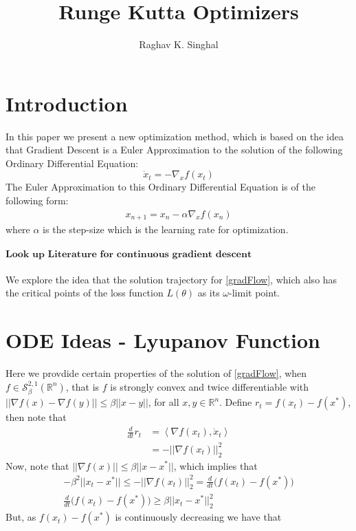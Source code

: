 \documentclass[12pt,twoside]{article}
\date{}   %
\begin{document}
\title{Runge Kutta Optimizers}

\author{Raghav K. Singhal}

\maketitle

\section{Introduction}
In this paper we present a new optimization method, which is based on the idea that Gradient Descent is a Euler Approximation to the solution of the following Ordinary Differential Equation:
\begin{equation}\label{gradFlow}
\dot{x}_t = -\nabla_{x}f(x_t)
\end{equation}
The Euler Approximation to this Ordinary Differential Equation is of the following form:
\begin{align*}
x_{n+1} =  x_n - \alpha \nabla_{x}f(x_n)
\end{align*}
where $\alpha$ is the step-size which is the learning rate for optimization.
\\
\\
$\textbf{Look up Literature for continuous gradient descent}$
\\
\\
We explore the idea that the solution trajectory for \eqref{gradFlow}, which also has the critical points of the loss function $L(\theta)$ as its $\omega$-limit point.

\section{ODE Ideas - Lyupanov Function}
Here we provdide certain properties of the solution of \eqref{gradFlow}, when $f \in \mathcal{S}^{2,1}_{\beta}(\mathbb{R}^n)$, that is $f$ is strongly convex and twice differentiable with $|| \nabla f(x) - \nabla f(y) || \leq \beta ||x - y||$, for all $x,y \in \mathbb{R}^n$. Define $r_t = f(x_t) - f(x^*)$, then note that
\begin{equation}
\begin{aligned}
\frac{d}{dt}r_t &= \left\langle \nabla f(x_t), \dot{x}_t \right\rangle \\
& = - ||\nabla f(x_t)||_2^2
\end{aligned}
\end{equation}
Now, note that $|| \nabla f(x) || \leq \beta || x - x^* ||$, which implies that
\begin{equation}
\begin{aligned}
- \beta^2 || x_t - x^* || \leq -||\nabla f(x_t)||_2^2 = \frac{d}{dt}\big(f(x_t) -f(x^*)\big) \\
\frac{d}{dt} \big(f(x_t) - f(x^*) \big) \geq \beta || x_t - x^* ||_2^2
\end{aligned}
\end{equation}
But, as $f(x_t) - f(x^*)$ is continuously decreasing we have that
\end{document}
